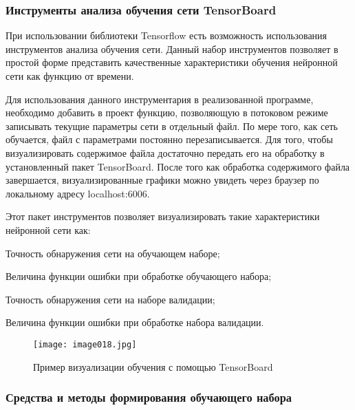 \subsubsection{Инструменты анализа обучения сети TensorBoard}

При использовании библиотеки Tensorflow есть возможность использования инструментов анализа обучения сети. Данный набор инструментов позволяет в простой форме представить качественные характеристики обучения нейронной сети как функцию от времени. 

Для использования данного инструментария в реализованной программе, необходимо добавить в проект функцию, позволяющую в потоковом режиме записывать текущие параметры сети в отдельный файл. По мере того, как сеть обучается, файл с параметрами постоянно перезаписывается. Для того, чтобы визуализировать содержимое файла достаточно передать его на обработку в установленный пакет TensorBoard. После того как обработка содержимого файла завершается, визуализированные графики можно увидеть через браузер по локальному адресу localhost:6006.

Этот пакет инструментов позволяет визуализировать такие характеристики нейронной сети как:
%
\begin{itemize*}
  \item Точность обнаружения сети на обучающем наборе;
  \item Величина функции ошибки при обработке обучающего набора;
  \item Точность обнаружения сети на наборе валидации;
  \item Величина функции ошибки при обработке набора валидации.
\end{itemize*}
%

\begin{figure}[htbp]
\centering
\texttt{[image: image018.jpg]}
\caption{Пример визуализации обучения с помощью TensorBoard}%
\label{fig:how-to-do-research}
\end{figure}

\subsubsection{Средства и методы формирования обучающего набора}


